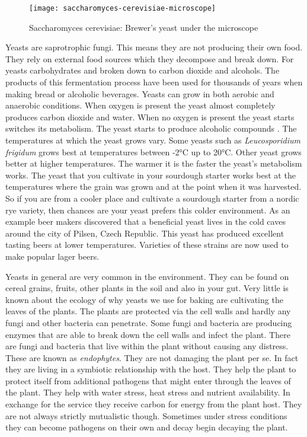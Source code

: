 \begin{figure}[!htb]
  \centering
  \texttt{[image: saccharomyces-cerevisiae-microscope]}
  \caption{Saccharomyces cerevisiae: Brewer's yeast under the microscope}
  \label{saccharomyces-cerevisiae-microscope}
\end{figure}


Yeasts are saprotrophic fungi. This means they are not
producing their own food. They rely on external food sources
which they decompose and break down. For yeasts
carbohydrates and broken down to carbon dioxide and
alcohols. The products of this fermentation process
have been used for thousands of years when making
bread or alcoholic beverages. Yeasts can grow
in both aerobic and anaerobic conditions. When oxygen
is present the yeast almost completely produces
carbon dioxide and water. When no oxygen is present
the yeast starts switches its metabolism. The
yeast starts to produce alcoholic compounds \cite{effects+oxygen+yeast+growth}.
The temperatures at which the yeast grows vary. Some
yeasts such as {\it Leucosporidium frigidum} grows
best at temperatures between -2°C up to 20°C. Other
yeast grows better at higher temperatures. The warmer
it is the faster the yeast's metabolism works. The yeast
that you cultivate in your sourdough starter works best
at the temperatures where the grain was grown and at
the point when it was harvested. So if you are from a 
cooler place and cultivate a sourdough starter from
a nordic rye variety, then chances are your yeast
prefers this colder environment. As an example
beer makers discovered that a beneficial yeast lives
in the cold caves around the city of Pilsen, Czech Republic.
This yeast has produced excellent tasting beers at
lower temperatures. Varieties of these strains
are now used to make popular lager beers.

Yeasts in general are very common in the environment.
They can be found on cereal grains, fruits, other plants
in the soil and also in your gut. Very little is known
about the ecology of why yeasts we use for baking
are cultivating the leaves of the plants. The plants
are protected via the cell walls and hardly any
fungi and other bacteria can penetrate. Some fungi and
bacteria are producing enzymes that are able
to break down the cell walls and infect the plant.
There are fungi and bacteria that live within the plant
without causing any distress. These are known as {\it endophytes}.
They are not damaging the plant per se. In fact they are
living in a symbiotic relationship with the host. They
help the plant to protect itself from additional pathogens
that might enter through the leaves of the plant. They
help with water stress, heat stress and nutrient availability. 
In exchange for the service they receive carbon for energy
from the plant host. They are not always strictly mutualistic though.
Sometimes under stress conditions they can become pathogens
on their own \cite{endophytes+in+plants} and decay begin
decaying the plant.

